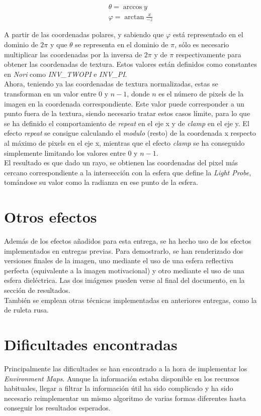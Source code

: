\documentclass[10pt,oneside,a4paper]{article}
\begin{document}
\begin{gather}
\theta = \arccos{y}\\
\varphi =  \arctan{\frac{x}{-z}}
\end{gather}

A partir de las coordenadas polares, y sabiendo que $\varphi$ está representado en el dominio de $2\pi$ y que $\theta$ se representa en el dominio de $\pi$, sólo es necesario multiplicar las coordenadas por la inversa de $2\pi$ y de $\pi$ respectivamente para obtener las coordenadas de textura. Estos valores están definidos como constantes en \emph{Nori} como \emph{INV\_TWOPI} e \emph{INV\_PI}.\\

Ahora, teniendo ya las coordenadas de textura normalizadas, estas se transforman en un valor entre $0$ y $n-1$, donde $n$ es el número de pixels de la imagen en la coordenada correspondiente. Este valor puede corresponder a un punto fuera de la textura, siendo necesario tratar estos casos límite, para lo que se ha definido el comportamiento de \emph{repeat} en el eje x y de \emph{clamp} en el eje y. El efecto \emph{repeat} se consigue calculando el \emph{modulo} (resto) de la coordenada x respecto al máximo de pixels en el eje x, mientras que el efecto \emph{clamp} se ha conseguido simplemente limitando los valores entre $0$ y $n-1$.\\

El resultado es que dado un rayo, se obtienen las coordenadas del pixel más cercano correspondiente a la intersección con la esfera que define la \emph{Light Probe}, tomándose su valor como la radianza en ese punto de la esfera.

\newpage
\section{Otros efectos}
Además de los efectos añadidos para esta entrega, se ha hecho uso de los efectos implementados en entregas previas. Para demostrarlo, se han renderizado dos versiones finales de la imagen, uno mediante el uso de una esfera reflectiva perfecta (equivalente a la imagen motivacional) y otro mediante el uso de una esfera dieléctrica. Las dos imágenes pueden verse al final del documento, en la sección de resultados.\\

También se emplean otras técnicas implementadas en anteriores entregas, como la de ruleta rusa.

\section{Dificultades encontradas}
Principalmente las dificultades se han encontrado a la hora de implementar los \emph{Environment Maps}. Aunque la información estaba disponible en los recursos habituales, llegar a filtrar la información útil ha sido complicado y ha sido necesario reimplementar un mismo algoritmo de varias formas diferentes hasta conseguir los resultados esperados. \\
\end{document}
